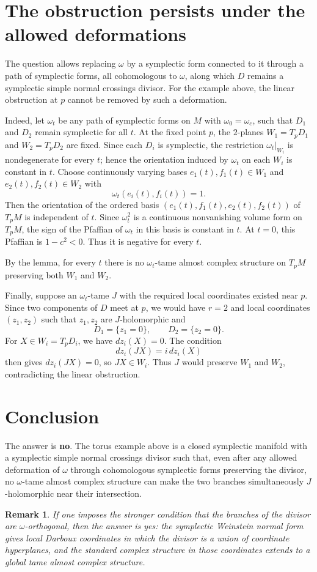 \documentclass{article}
\newtheorem{remark}{Remark}
\begin{document}
\section{The obstruction persists under the allowed deformations}

The question allows replacing $\omega$ by a symplectic form connected to it
through a path of symplectic forms, all cohomologous to $\omega$, along which
$D$ remains a symplectic simple normal crossings divisor. For the example above,
the linear obstruction at $p$ cannot be removed by such a deformation.

Indeed, let $\omega_t$ be any path of symplectic forms on $M$ with
$\omega_0=\omega_c$, such that $D_1$ and $D_2$ remain symplectic
for all $t$. At the fixed point $p$, the $2$-planes
$W_1=T_pD_1$ and $W_2=T_pD_2$ are fixed. Since each $D_i$ is symplectic,
the restriction $\omega_t|_{W_i}$ is nondegenerate for every $t$; hence the
orientation induced by $\omega_t$ on each $W_i$ is constant in $t$.
Choose continuously varying bases $e_1(t),f_1(t)\in W_1$ and
$e_2(t),f_2(t)\in W_2$ with
\[
\omega_t(e_i(t),f_i(t))=1.
\]
Then the orientation of the ordered basis
$(e_1(t),f_1(t),e_2(t),f_2(t))$ of $T_pM$ is independent of $t$.
Since $\omega_t^2$ is a continuous nonvanishing volume form on $T_pM$,
the sign of the Pfaffian of $\omega_t$ in this basis is constant in $t$.
At $t=0$, this Pfaffian is $1-c^2<0$. Thus it is negative for every $t$.

By the lemma, for every $t$ there is no $\omega_t$-tame almost complex
structure on $T_pM$ preserving both $W_1$ and $W_2$.

Finally, suppose an $\omega_t$-tame $J$ with the required local coordinates
existed near $p$. Since two components of $D$ meet at $p$, we would have $r=2$
and local coordinates $(z_1,z_2)$ such that $z_1,z_2$ are $J$-holomorphic and
\[
D_1=\{z_1=0\},\qquad D_2=\{z_2=0\}.
\]
For $X\in W_i=T_pD_i$, we have $dz_i(X)=0$. The condition
\[
dz_i(JX)=i\,dz_i(X)
\]
then gives $dz_i(JX)=0$, so $JX\in W_i$. Thus $J$ would preserve $W_1$ and
$W_2$, contradicting the linear obstruction.

\section{Conclusion}

The answer is \textbf{no}. The torus example above is a closed symplectic manifold
with a symplectic simple normal crossings divisor such that, even after any allowed
deformation of $\omega$ through cohomologous symplectic forms preserving the divisor,
no $\omega$-tame almost complex structure can make the two branches simultaneously
$J$-holomorphic near their intersection.

\begin{remark}
If one imposes the stronger condition that the branches of the divisor are
$\omega$-orthogonal, then the answer is yes: the symplectic Weinstein normal form
gives local Darboux coordinates in which the divisor is a union of coordinate
hyperplanes, and the standard complex structure in those coordinates extends to a
global tame almost complex structure.
\end{remark}
\end{document}
